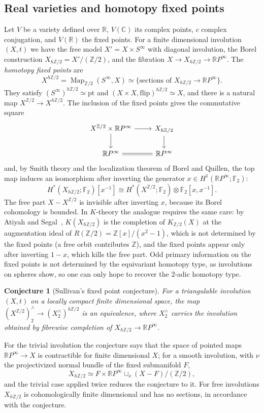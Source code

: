 \documentclass[11pt]{amsart}
\theoremstyle{plain}
\newtheorem*{conjecture*}{Conjecture}
\theoremstyle{definition}
\numberwithin{equation}{section}
\newcommand{\Z}{\mathbb{Z}}
\newcommand{\R}{\mathbb{R}}
\newcommand{\C}{\mathbb{C}}
\newcommand{\F}{\mathbb{F}}
\newcommand{\RP}{\mathbb{R}P}
\DeclareMathOperator{\Map}{Map}
\begin{document}
\subsection{Real varieties and homotopy fixed points}
Let $V$ be a variety defined over $\R$, $V(\C)$ its complex points, $c$ complex conjugation, and $V(\R)$ the fixed points.
For a finite dimensional involution $(X,t)$ we have the free model $X'=X\times S^\infty$ with diagonal involution, the Borel construction $X_{h\Z/2}=X'/(\Z/2)$, and the fibration $X\to X_{h\Z/2}\to\RP^\infty$.
The \emph{homotopy fixed points} are
\[
X^{h\Z/2}=\Map_{\Z/2}(S^\infty,X)\simeq\{\text{sections of }X_{h\Z/2}\to\RP^\infty\}.
\]
They satisfy $(S^\infty)^{h\Z/2}\simeq\mathrm{pt}$ and $(X\times X,\mathrm{flip})^{h\Z/2}\simeq X$, and there is a natural map $X^{\Z/2}\to X^{h\Z/2}$.
The inclusion of the fixed points gives the commutative square
\[
\begin{tikzcd}
X^{\Z/2}\times\RP^\infty\arrow[r]\arrow[d] & X_{h\Z/2}\arrow[d]\\
\RP^\infty\arrow[r,equal] & \RP^\infty
\end{tikzcd}
\]
and, by Smith theory and the localization theorem of Borel and Quillen, the top map induces an isomorphism after inverting the generator $x\in H^1(\RP^\infty;\F_2)$:
\[
H^*(X_{h\Z/2};\F_2)[x^{-1}]\cong H^*(X^{\Z/2};\F_2)\otimes\F_2[x,x^{-1}].
\]
The free part $X-X^{\Z/2}$ is invisible after inverting $x$, because its Borel cohomology is bounded.
In $K$-theory the analogue requires the same care: by Atiyah and Segal~\cite{AtiyahSegal}, $K(X_{h\Z/2})$ is the completion of $K_{\Z/2}(X)$ at the augmentation ideal of $R(\Z/2)=\Z[x]/(x^2-1)$, which is not determined by the fixed points (a free orbit contributes $\Z$), and the fixed points appear only after inverting $1-x$, which kills the free part.
Odd primary information on the fixed points is not determined by the equivariant homotopy type, as involutions on spheres show, so one can only hope to recover the $2$-adic homotopy type.

\begin{conjecture*}[Sullivan's fixed point conjecture]
For a triangulable involution $(X,t)$ on a locally compact finite dimensional space, the map $(X^{\Z/2})^\wedge_2\to(X^\wedge_2)^{h\Z/2}$ is an equivalence, where $X^\wedge_2$ carries the involution obtained by fibrewise completion of $X_{h\Z/2}\to\RP^\infty$.
\end{conjecture*}

For the trivial involution the conjecture says that the space of pointed maps $\RP^\infty\to X$ is contractible for finite dimensional $X$; for a smooth involution, with $\nu$ the projectivized normal bundle of the fixed submanifold $F$,
\[
X_{h\Z/2}\simeq F\times\RP^\infty\cup_\nu(X-F)/(\Z/2),
\]
and the trivial case applied twice reduces the conjecture to it.
For free involutions $X_{h\Z/2}$ is cohomologically finite dimensional and has no sections, in accordance with the conjecture.
\end{document}
